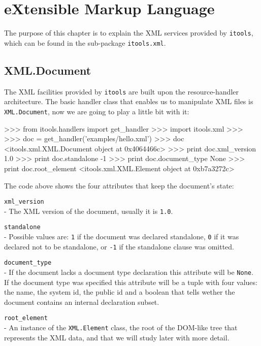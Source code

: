 \chapter{eXtensible Markup Language}

The purpose of this chapter is to explain the XML services provided by
{\tt itools}, which can be found in the sub-package {\tt itools.xml}.

\section{XML.Document}

The XML facilities provided by {\tt itools} are built upon the resource-handler
architecture. The basic handler class that enables us to manipulate XML files
is {\tt XML.Document}, now we are going to play a little bit with it:

\begin{code}
    >>> from itools.handlers import get_handler
    >>> import itools.xml
    >>>
    >>> doc = get_handler('examples/hello.xml')
    >>> doc
    <itools.xml.XML.Document object at 0x4064466c>
    >>> print doc.xml_version
    1.0
    >>> print doc.standalone 
    -1
    >>> print doc.document_type
    None
    >>> print doc.root_element
    <itools.xml.XML.Element object at 0xb7a3272c>
\end{code}

The code above shows the four attributes that keep the document's state:

\begin{api}
    {\tt xml\_version}\\
    - The XML version of the document, usually it is {\tt 1.0}.

    {\tt standalone}\\
    - Possible values are: {\tt 1} if the document was declared standalone,
      {\tt 0} if it was declared not to be standalone, or {\tt -1} if the
      standalone clause was omitted.

    {\tt document\_type}\\
    - If the document lacks a document type declaration this attribute will
      be {\tt None}. If the document type was specified this attribute will
      be a tuple with four values: the name, the system id, the public id
      and a boolean that tells wether the document contains an internal
      declaration subset.

    {\tt root\_element}\\
    - An instance of the {\tt XML.Element} class, the root of the DOM-like
      tree that represents the XML data, and that we will study later with
      more detail.
\end{api}


